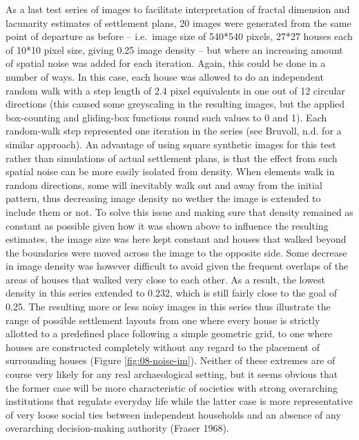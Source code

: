 \documentclass[
  12pt,
  a4paper, twoside]{book}
\begin{document}
As a last test series of images to facilitate interpretation of fractal dimension and lacunarity estimates of settlement plans, 20 images were generated from the same point of departure as before -- i.e.~image size of 540*540 pixels, 27*27 houses each of 10*10 pixel size, giving 0.25 image density -- but where an increasing amount of spatial noise was added for each iteration. Again, this could be done in a number of ways. In this case, each house was allowed to do an independent random walk with a step length of 2.4 pixel equivalents in one out of 12 circular directions (this caused some greyscaling in the resulting images, but the applied box-counting and gliding-box functions round such values to 0 and 1). Each random-walk step represented one iteration in the series (see Bruvoll, n.d. for a similar approach). An advantage of using square synthetic images for this test rather than simulations of actual settlement plans, is that the effect from such spatial noise can be more easily isolated from density. When elements walk in random directions, some will inevitably walk out and away from the initial pattern, thus decreasing image density no wether the image is extended to include them or not. To solve this issue and making sure that density remained as constant as possible given how it was shown above to influence the resulting estimates, the image size was here kept constant and houses that walked beyond the boundaries were moved across the image to the opposite side. Some decrease in image density was however difficult to avoid given the frequent overlaps of the areas of houses that walked very close to each other. As a result, the lowest density in this series extended to 0.232, which is still fairly close to the goal of 0.25. The resulting more or less noisy images in this series thus illustrate the range of possible settlement layouts from one where every house is strictly allotted to a predefined place following a simple geometric grid, to one where houses are constructed completely without any regard to the placement of surrounding houses (Figure \ref{fig:08-noise-im}). Neither of these extremes are of course very likely for any real archaeological setting, but it seems obvious that the former case will be more characteristic of societies with strong overarching institutions that regulate everyday life while the latter case is more representative of very loose social ties between independent households and an absence of any overarching decision-making authority (Fraser 1968).
\end{document}
